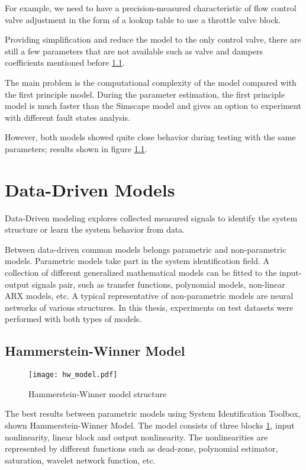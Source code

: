 For example, we need to have a precision-measured characteristic of flow
control valve adjustment in the form of a lookup table to use a throttle
valve block.

Providing simplification and reduce the model to the only control valve,
there are still a few parameters that are not available such as valve and
dampers coefficients mentioned before \ref{}.

The main problem is the computational complexity of the model compared with
the first principle model. During the parameter estimation, the first
principle model is much faster than the Simscape model and gives an option
to experiment with different fault states analysis. 

However, both models showed quite close behavior during testing with the
same parameters; results shown in figure \ref{}.


\section{Data-Driven Models}
Data-Driven modeling explores collected measured signals to identify the
system structure or learn the system behavior from data.

Between data-driven common models belongs parametric and non-parametric
models. Parametric models take part in the system identification field. A
collection of different generalized mathematical models can be fitted to
the input-output signals pair, such as transfer functions, polynomial
models, non-linear ARX models, etc.  A typical representative of
non-parametric models are neural networks of various structures.  In this
thesis, experiments on test datasets were performed with both types of
models. 

\subsection{Hammerstein-Winner Model}

\begin{figure}[h!]
    \centering
    \texttt{[image: hw\_model.pdf]}
    \caption{Hammerstein-Winner model structure}
    \label{fig:hw_model}
\end{figure}

The best results between parametric models using System Identification
Toolbox, shown Hammerstein-Winner Model. The model consists of three blocks
\ref{fig:hw_model}, input nonlinearity, linear block and output
nonlinearity.  The nonlinearities are represented by different functions
such as dead-zone, polynomial estimator, saturation, wavelet network
function, etc. 


